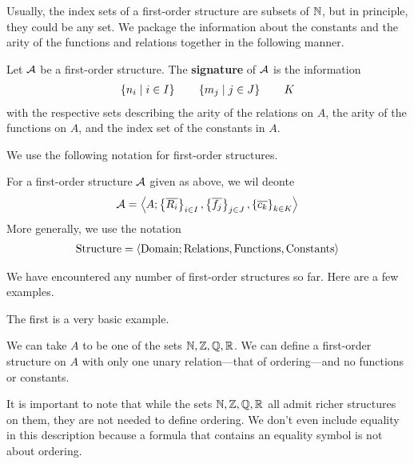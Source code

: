 Usually, the index sets of a first-order structure are subsets of $\mathbb{N}$, but in principle, they could be any set. We package the information about the constants and the arity of the functions and relations together in the following manner.

\begin{boxdefinition}[Signature]
    Let $\mathcal{A}$ be a first-order structure. The \textbf{signature} of $\mathcal{A}$ is the information
    \begin{align*}
        \left\{ n_i \; \middle\vert \; i \in I \right\}
        \qquad
        \left\{ m_j \; \middle\vert \; j \in J \right\}
        \qquad
        K
    \end{align*}
    with the respective sets describing the arity of the relations on $A$, the arity of the functions on $A$, and the index set of the constants in $A$.
\end{boxdefinition}

We use the following notation for first-order structures.

\begin{boxconvention}
    For a first-order structure $\mathcal{A}$ given as above, we wil deonte
    \begin{align*}
        \mathcal{A} = \left\langle A; \left\{ \overline{R_i} \right\}_{i \in I}, \left\{ \overline{f_j} \right\}_{j \in J}, \left\{ \overline{c_k} \right\}_{k \in K} \right\rangle
    \end{align*}
    More generally, we use the notation
    \begin{align*}
        \text{Structure} = \left\langle \text{Domain}; \text{Relations}, \text{Functions}, \text{Constants} \right\rangle
    \end{align*}
\end{boxconvention}

We have encountered any number of first-order structures so far. Here are a few examples.

The first is a very basic example.
\begin{boxexample}[Orderings]
    We can take $A$ to be one of the sets $\mathbb{N}, \mathbb{Z}, \mathbb{Q}, \mathbb{R}$. We can define a first-order structure on $A$ with only one unary relation---that of ordering---and no functions or constants.
\end{boxexample}
It is important to note that while the sets $\mathbb{N}, \mathbb{Z}, \mathbb{Q}, \mathbb{R}$ all admit richer structures on them, they are not needed to define ordering. We don't even include equality in this description because a formula that contains an equality symbol is not about ordering.

